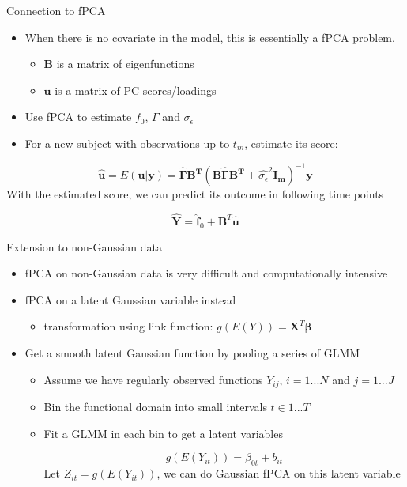 \documentclass[
  ignorenonframetext,
]{beamer}
\providecommand{\tightlist}{%
  \setlength{\itemsep}{0pt}\setlength{\parskip}{0pt}}
\begin{document}
\begin{frame}{Connection to fPCA}
\protect\hypertarget{connection-to-fpca}{}
\begin{itemize}
\item
  When there is no covariate in the model, this is essentially a fPCA
  problem.

  \begin{itemize}
  \tightlist
  \item
    \(\boldsymbol{B}\) is a matrix of eigenfunctions
  \item
    \(\boldsymbol{u}\) is a matrix of PC scores/loadings
  \end{itemize}
\item
  Use fPCA to estimate \(f_0\), \(\Gamma\) and \(\sigma_{\epsilon}\)
\item
  For a new subject with observations up to \(t_m\), estimate its score:
\end{itemize}

\[\hat{\boldsymbol{u}} = E(\boldsymbol{u}|\boldsymbol{y}) =  \boldsymbol{\hat{\Gamma}B^T}(\boldsymbol{B\hat{\Gamma}B^T}+\hat{\sigma_{\epsilon}}^2\boldsymbol{I_m})^{-1}\boldsymbol{y}\]
With the estimated score, we can predict its outcome in following time
points

\[\hat{\boldsymbol{Y}} = \hat{\boldsymbol{f}}_0+ \boldsymbol{B}^T\hat{\boldsymbol{u}} \]
\end{frame}

\begin{frame}{Extension to non-Gaussian data}
\protect\hypertarget{extension-to-non-gaussian-data}{}
\begin{itemize}
\tightlist
\item
  fPCA on non-Gaussian data is very difficult and computationally
  intensive
\item
  fPCA on a latent Gaussian variable instead

  \begin{itemize}
  \tightlist
  \item
    transformation using link function:
    \(g(E(Y))=\boldsymbol{X}^T\boldsymbol{\beta}\)
  \end{itemize}
\item
  Get a smooth latent Gaussian function by pooling a series of GLMM

  \begin{itemize}
  \item
    Assume we have regularly observed functions \(Y_{ij}\),
    \(i = 1... N\) and \(j = 1...J\)
  \item
    Bin the functional domain into small intervals \(t\in {1...T}\)
  \item
    Fit a GLMM in each bin to get a latent variables

    \[g(E(Y_{it})) = \beta_{0t}+b_{it}\] Let \(Z_{it} = g(E(Y_{it}))\),
    we can do Gaussian fPCA on this latent variable
  \end{itemize}
\end{itemize}
\end{frame}
\end{document}
